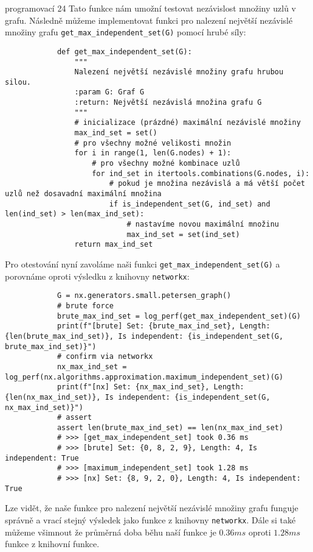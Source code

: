 \documentclass[10pt, a4paper]{ReportSheet}
\begin{document}
\begin{uloha}{programovací 2}{4}
        Tato funkce nám umožní testovat nezávislost množiny uzlů v grafu. Následně můžeme implementovat funkci pro
        nalezení největší nezávislé množiny grafu \texttt{get\_max\_independent\_set(G)} pomocí hrubé síly:
        \begin{verbatim}
            def get_max_independent_set(G):
                """
                Nalezení největší nezávislé množiny grafu hrubou silou.
                :param G: Graf G
                :return: Největší nezávislá množina grafu G
                """
                # inicializace (prázdné) maximální nezávislé množiny
                max_ind_set = set()
                # pro všechny možné velikosti množin
                for i in range(1, len(G.nodes) + 1):
                    # pro všechny možné kombinace uzlů
                    for ind_set in itertools.combinations(G.nodes, i):
                        # pokud je množina nezávislá a má větší počet uzlů než dosavadní maximální množina
                        if is_independent_set(G, ind_set) and len(ind_set) > len(max_ind_set):
                            # nastavíme novou maximální množinu
                            max_ind_set = set(ind_set)
                return max_ind_set
        \end{verbatim}

        Pro otestování nyní zavoláme naši funkci \texttt{get\_max\_independent\_set(G)} a porovnáme oproti výsledku z
        knihovny \texttt{networkx}:
        \begin{verbatim}
            G = nx.generators.small.petersen_graph()
            # brute force
            brute_max_ind_set = log_perf(get_max_independent_set)(G)
            print(f"[brute] Set: {brute_max_ind_set}, Length: {len(brute_max_ind_set)}, Is independent: {is_independent_set(G, brute_max_ind_set)}")
            # confirm via networkx
            nx_max_ind_set = log_perf(nx.algorithms.approximation.maximum_independent_set)(G)
            print(f"[nx] Set: {nx_max_ind_set}, Length: {len(nx_max_ind_set)}, Is independent: {is_independent_set(G, nx_max_ind_set)}")
            # assert
            assert len(brute_max_ind_set) == len(nx_max_ind_set)
            # >>> [get_max_independent_set] took 0.36 ms
            # >>> [brute] Set: {0, 8, 2, 9}, Length: 4, Is independent: True
            # >>> [maximum_independent_set] took 1.28 ms
            # >>> [nx] Set: {8, 9, 2, 0}, Length: 4, Is independent: True
        \end{verbatim}

        Lze vidět, že naše funkce pro nalezení největší nezávislé množiny grafu funguje správně a vrací stejný výsledek
        jako funkce z knihovny \texttt{networkx}. Dále si také můžeme všimnout že průměrná doba běhu naší funkce je $0
        .36ms$ oproti $1.28ms$ funkce z knihovní funkce.


\end{uloha}
\end{document}
